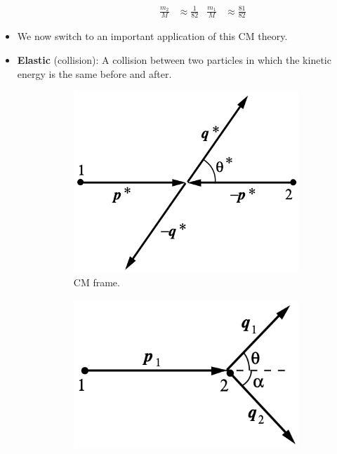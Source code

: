 \documentclass[../notes.tex]{subfiles}
\begin{document}
\begin{itemize}
\begin{itemize}
\begin{itemize}
            \begin{align*}
                \frac{m_2}{M} &\approx \frac{1}{82}&
                \frac{m_1}{M} &\approx \frac{81}{82}
            \end{align*}
        \end{itemize}
    \end{itemize}
    \item We now switch to an important application of this CM theory.
    \item \textbf{Elastic} (collision): A collision between two particles in which the kinetic energy is the same before and after.
    \begin{figure}[h!]
        \centering
        \begin{subfigure}[b]{0.35\linewidth}
            \centering
            \includegraphics[width=0.8\linewidth]{../ExtFiles/CMelastica.png}
            \caption{CM frame.}
            \label{fig:CMelastica}
        \end{subfigure}
        \begin{subfigure}[b]{0.35\linewidth}
            \centering
            \includegraphics[width=0.7\linewidth]{../ExtFiles/CMelasticb.png}

\end{subfigure}
\end{figure}
\end{itemize}
\end{document}
